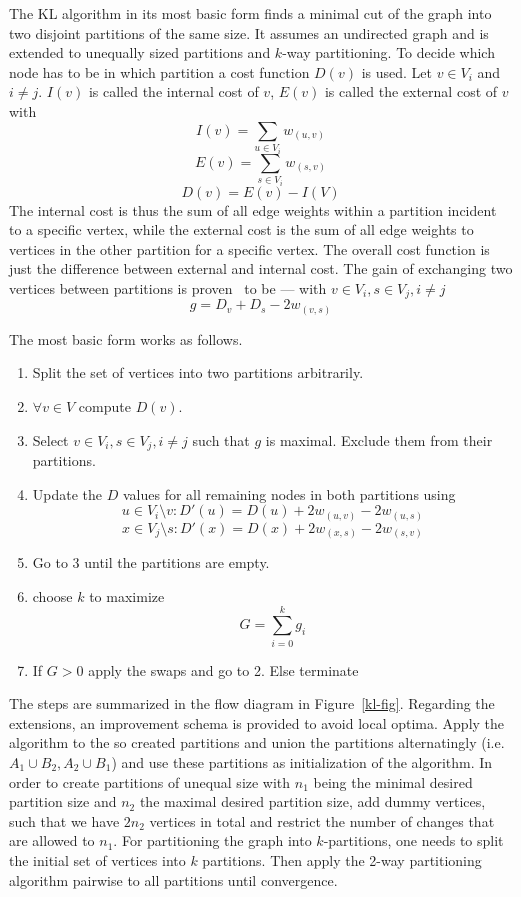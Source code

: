             The KL algorithm in its most basic form finds a minimal cut of the graph into two disjoint partitions of the same size. 
            It assumes an undirected graph and is extended to unequally sized partitions and $k$-way partitioning. 
            To decide which node has to be in which partition a cost function $D(v)$ is used. 
            Let $v  \in V_i$ and $i \neq j$. $I(v)$ is called the internal cost of $v$, $E(v)$ is called the external cost of $v$ with
            \[ I(v) = \sum_{u \in V_i} w_{(u, v)} \]
            \[ E(v) = \sum_{s \in V_i} w_{(s, v)} \]
            \[   D(v) = E(v) - I(V)   \]
            The internal cost is thus the sum of all edge weights within a partition incident to a specific vertex, while the external cost is the sum of all edge weights to vertices in the other partition for a specific vertex. 
            The overall cost function is just the difference between external and internal cost.
            The gain of exchanging two vertices between partitions is proven~\autocite{kl} to be --- with $v \in V_i, s \in V_j, i \neq j$
            \[ g = D_v + D_s - 2 w_{(v,s)} \]
            
            The most basic form works as follows.
            \begin{enumerate}
                \item Split the set of vertices into two partitions arbitrarily.
                \item $\forall v \in V$ compute $D(v)$.
                \item Select $v \in V_i, s \in V_j, i \neq j$ such that $g$ is maximal. Exclude them from their partitions.
                \item Update the $D$ values for all remaining nodes in both partitions using 
                \[ u \in V_i \setminus {v}: D'(u) = D(u) + 2 w_{(u, v)} - 2 w_{(u, s)} \]
                \[ x \in V_j \setminus {s}: D'(x) = D(x) + 2 w_{(x, s)} - 2 w_{(s, v)} \]
                \item Go to 3 until the partitions are empty.
                \item choose $k$ to maximize 
                \[ G = \sum^k_{i = 0} g_i \]
                \item If $G > 0$ apply the swaps and go to 2. Else terminate
            \end{enumerate}
            The steps are summarized in the flow diagram in Figure~\ref{kl-fig}.
            Regarding the extensions, an improvement schema is provided to avoid local optima.
            Apply the algorithm to the so created partitions and union the partitions alternatingly (i.e. $A_1 \cup B_2, A_2 \cup B_1$) and use these partitions as initialization of the algorithm.
            In order to create partitions of unequal size with $n_1$ being the minimal desired partition size and $n_2$ the maximal desired partition size, add dummy vertices, such that we have $2n_2$ vertices in total and restrict the number of changes that are allowed to $n_1$.
            For partitioning the graph into $k$-partitions, one needs to split the initial set of vertices into $k$ partitions. 
            Then apply the 2-way partitioning algorithm pairwise to all partitions until convergence.
            
